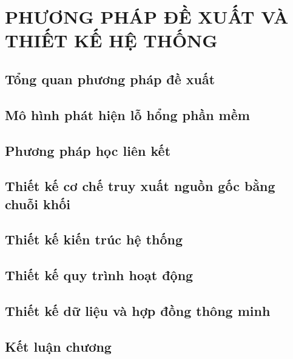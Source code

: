 \chapter{PHƯƠNG PHÁP ĐỀ XUẤT VÀ THIẾT KẾ HỆ THỐNG}

\section{Tổng quan phương pháp đề xuất}

\section{Mô hình phát hiện lỗ hổng phần mềm}

\section{Phương pháp học liên kết}

\section{Thiết kế cơ chế truy xuất nguồn gốc bằng chuỗi khối}

\section{Thiết kế kiến trúc hệ thống}

\section{Thiết kế quy trình hoạt động}

\section{Thiết kế dữ liệu và hợp đồng thông minh}

\section{Kết luận chương}
